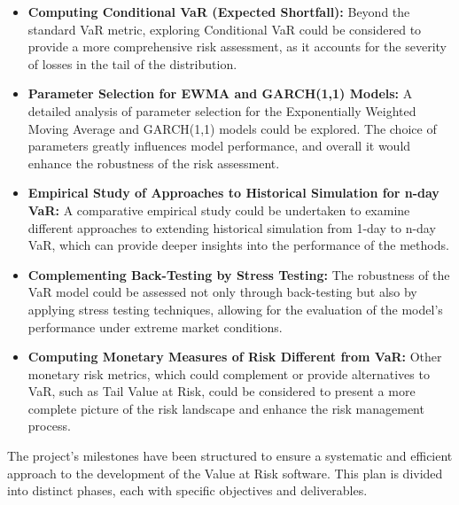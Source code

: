 \documentclass{article}
\begin{document}
\begin{itemize}
  \item \textbf{Computing Conditional VaR (Expected Shortfall):}  Beyond the standard VaR metric, exploring Conditional VaR could be considered to provide a more comprehensive risk assessment, as it accounts for the severity of losses in the tail of the distribution.

  \item \textbf{Parameter Selection for EWMA and GARCH(1,1) Models:} A detailed analysis of parameter selection for the Exponentially Weighted Moving Average and GARCH(1,1) models could be explored. The choice of parameters greatly influences model performance, and overall it would enhance the robustness of the risk assessment.
  
  \item \textbf{Empirical Study of Approaches to Historical Simulation for n-day VaR:} A comparative empirical study could be undertaken to examine different approaches to extending historical simulation from 1-day to n-day VaR, which can provide deeper insights into the performance of the methods.
  
  \item \textbf{Complementing Back-Testing by Stress Testing:} The robustness of the VaR model could be assessed not only through back-testing but also by applying stress testing techniques, allowing for the evaluation of the model's performance under extreme market conditions.
  
  \item \textbf{Computing Monetary Measures of Risk Different from VaR:} Other monetary risk metrics, which could complement or provide alternatives to VaR, such as Tail Value at Risk, could be considered to present a more complete picture of the risk landscape and enhance the risk management process.
\end{itemize}

\newpage
The project's milestones have been structured to ensure a systematic and efficient approach to the development of the Value at Risk software. This plan is divided into distinct phases, each with specific objectives and deliverables.
\end{document}
